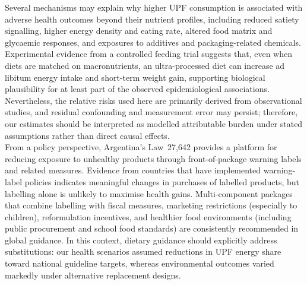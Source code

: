 \documentclass{article}
\begin{document}
Several mechanisms may explain why higher UPF consumption is associated with adverse health outcomes beyond their nutrient profiles, including reduced satiety signalling, higher energy density and eating rate, altered food matrix and glycaemic responses, and exposures to additives and packaging-related chemicals.\cite{Lane2024BMJ,Yates2024} Experimental evidence from a controlled feeding trial suggests that, even when diets are matched on macronutrients, an ultra-processed diet can increase ad libitum energy intake and short-term weight gain,\cite{Hall2019} supporting biological plausibility for at least part of the observed epidemiological associations. Nevertheless, the relative risks used here are primarily derived from observational studies, and residual confounding and measurement error may persist; therefore, our estimates should be interpreted as modelled attributable burden under stated assumptions rather than direct causal effects. \\

From a policy perspective, Argentina's Law~27,642 provides a platform for reducing exposure to unhealthy products through front-of-package warning labels and related measures.\cite{ArgentinaLaw27642} Evidence from countries that have implemented warning-label policies indicates meaningful changes in purchases of labelled products,\cite{Taillie2020ChileLaw} but labelling alone is unlikely to maximise health gains. Multi-component packages that combine labelling with fiscal measures, marketing restrictions (especially to children), reformulation incentives, and healthier food environments (including public procurement and school food standards) are consistently recommended in global guidance.\cite{WHO2024FiscalGuideline} In this context, dietary guidance should explicitly address substitutions: our health scenarios assumed reductions in UPF energy share toward national guideline targets, whereas environmental outcomes varied markedly under alternative replacement designs. \\
\end{document}
